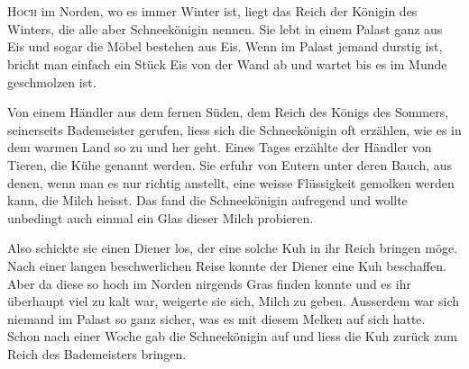 \chapter*{}
\lettrine[lines=3]{\color{DeepPink}H}{och} im Norden, wo es immer Winter ist, liegt das Reich der Königin des Winters, die alle aber Schneekönigin nennen. Sie lebt in einem Palast ganz aus Eis und sogar die Möbel bestehen aus Eis. Wenn im Palast jemand durstig ist, bricht man einfach ein Stück Eis von der Wand ab und wartet bis es im Munde geschmolzen ist.

Von einem Händler aus dem fernen Süden, dem Reich des Königs des Sommers, seinerseits Bademeister gerufen, liess sich die Schneekönigin oft erzählen, wie es in dem warmen Land so zu und her geht.  Eines Tages erzählte der Händler von Tieren, die Kühe genannt werden. Sie erfuhr von Eutern unter deren Bauch, aus denen, wenn man es nur richtig anstellt, eine weisse Flüssigkeit gemolken werden kann, die Milch heisst. Das fand die Schneekönigin aufregend und wollte unbedingt auch einmal ein Glas dieser Milch probieren.

Also schickte sie einen Diener los, der eine solche Kuh in ihr Reich bringen möge. Nach einer langen beschwerlichen Reise konnte der Diener eine Kuh beschaffen. Aber da diese so hoch im Norden nirgends Gras finden konnte und es ihr überhaupt viel zu kalt war, weigerte sie sich, Milch zu geben. Ausserdem war sich niemand im Palast so ganz sicher, was es mit diesem Melken auf sich hatte. Schon nach einer Woche gab die Schneekönigin auf und liess die Kuh zurück zum Reich des Bademeisters bringen.

